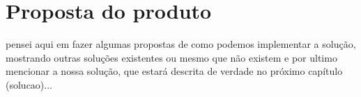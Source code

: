 \chapter{Proposta do produto}

pensei aqui em fazer algumas propostas de como podemos implementar a solução, 
mostrando outras soluções existentes ou mesmo que não existem e por ultimo 
mencionar a nossa solução, que estará descrita de verdade no próximo capítulo (solucao)...
